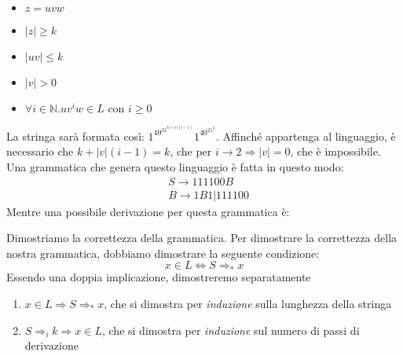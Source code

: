 \documentclass[a4paper,oneside]{scrbook}
\newcommand{\greenmark}{\quad \textcolor{green}{\checkmark}}
\newcommand{\blue}[1]{\textcolor{blue}{#1}}
\begin{document}
\begin{itemize}
	\item $z=uvw$
	\item $|z|\geq k$
	\item $|uv|\leq k$
	\item $|v|>0$
	\item $\forall i \in \mathbb{N}.uv^iw\in L \text{ con }i\geq0$
\end{itemize}
La stringa sarà formata così: $1^40^21^{k+|v|(i-1)}1^40^21^k$.
Affinché appartenga al linguaggio, è necessario che $k+|v|(i-1)=k$, che per $i \rightarrow 2 \Rightarrow |v|=0$, che è impossibile. \greenmark\\
Una grammatica che genera questo linguaggio è fatta in questo modo:
\begin{align*}
	&S \rightarrow 111100B\\
	&B \rightarrow 1B1|111100
\end{align*}
Mentre una possibile derivazione per questa grammatica è:
\begin{center}
\end{center}
Dimostriamo la correttezza della grammatica.
Per dimostrare la correttezza della nostra grammatica, dobbiamo dimostrare la seguente condizione:
$$x\in L \Leftrightarrow S \Rightarrow_* x$$
Essendo una doppia implicazione, dimostreremo separatamente
\begin{enumerate}
	\item $x\in L \Rightarrow S \Rightarrow_* x $, che si dimostra per \textit{induzione} sulla lunghezza della stringa
	\item $ S \Rightarrow_i k \Rightarrow x \in L$, che si dimostra per \textit{induzione} sul numero di passi di derivazione
\end{enumerate}
\end{document}
